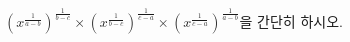 $(x^{\frac{1}{a-b}})^{\frac{1}{b-c}}\times(x^{\frac{1}{b-c}})^{\frac{1}{c-a}}\times(x^{\frac{1}{c-a}})^{\frac{1}{a-b}}$을 간단히 하시오. 
